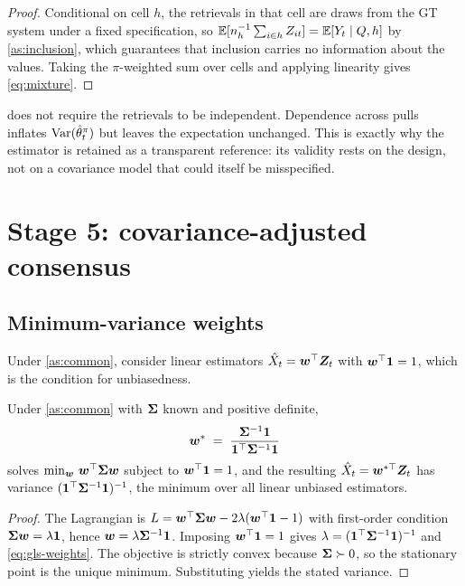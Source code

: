 \documentclass[12pt,a4paper,oneside]{article}
\begin{document}
\begin{proof}
Conditional on cell $h$, the retrievals in that cell are draws from the GT
system under a fixed specification, so
$\mathbb{E}[n_h^{-1}\sum_{i \in h} Z_{it}] = \mathbb{E}[Y_t \mid Q, h]$ by
\cref{as:inclusion}, which guarantees that inclusion carries no information
about the values. Taking the $\pi$-weighted sum over cells and applying
linearity gives \eqref{eq:mixture}.
\end{proof}

\begin{remark}
 does not require the retrievals to be independent. Dependence
across pulls inflates $\operatorname{Var}(\hat{\theta}^{\pi}_t)$ but leaves the expectation
unchanged. This is exactly why the estimator is retained as a transparent
reference: its validity rests on the design, not on a covariance model that
could itself be misspecified.
\end{remark}

\section{Stage 5: covariance-adjusted consensus}\label{sec:consensus}

\subsection{Minimum-variance weights}

Under \cref{as:common}, consider linear estimators
$\hat{X}_t = \bm{w}^{\top}\bm{Z}_t$ with $\bm{w}^{\top}\bm{1} = 1$, which is the
condition for unbiasedness.

\begin{proposition}\label{prop:blue}
Under \cref{as:common} with $\bm{\Sigma}$ known and positive definite,
\begin{equation}
\bm{w}^{*} \;=\; \frac{\bm{\Sigma}^{-1}\bm{1}}{\bm{1}^{\top}\bm{\Sigma}^{-1}\bm{1}}
\label{eq:gls-weights}
\end{equation}
solves $\min_{\bm{w}}\, \bm{w}^{\top}\bm{\Sigma}\bm{w}$ subject to
$\bm{w}^{\top}\bm{1} = 1$, and the resulting
$\hat{X}_t = \bm{w}^{*\top}\bm{Z}_t$ has variance
$(\bm{1}^{\top}\bm{\Sigma}^{-1}\bm{1})^{-1}$, the minimum over all linear unbiased
estimators.
\end{proposition}

\begin{proof}
The Lagrangian is
$L = \bm{w}^{\top}\bm{\Sigma}\bm{w} - 2\lambda(\bm{w}^{\top}\bm{1} - 1)$ with first-order
condition $\bm{\Sigma}\bm{w} = \lambda\bm{1}$, hence $\bm{w} = \lambda\bm{\Sigma}^{-1}\bm{1}$.
Imposing $\bm{w}^{\top}\bm{1}=1$ gives
$\lambda = (\bm{1}^{\top}\bm{\Sigma}^{-1}\bm{1})^{-1}$ and \eqref{eq:gls-weights}. The
objective is strictly convex because $\bm{\Sigma} \succ 0$, so the stationary point is
the unique minimum. Substituting yields the stated variance.
\end{proof}
\end{document}
